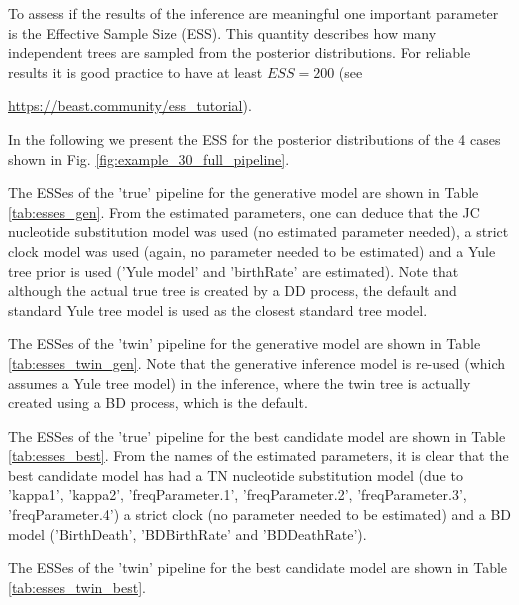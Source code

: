 To assess if the results of the inference are meaningful one important 
parameter is the Effective Sample Size (ESS). This quantity describes how 
many independent trees are sampled from the posterior distributions. 
For reliable results it is good practice to have at 
least $ESS = 200$ (see 
\begin{sloppypar}
  \url{https://beast.community/ess_tutorial}).
\end{sloppypar}
In the following we present the ESS for the posterior distributions of 
the 4 cases shown in Fig. \ref{fig:example_30_full_pipeline}.

The ESSes of the 'true' pipeline for the generative model
are shown in Table \ref{tab:esses_gen}.
From the estimated parameters, one can deduce that
the JC nucleotide substitution model was used (no
estimated parameter needed), a strict clock model was 
used (again, no parameter needed to be estimated)
and a Yule tree prior is used ('Yule model' and 'birthRate' are estimated).
Note that although the actual true tree is created by a DD process, 
the default and standard Yule tree model is used as the closest
standard tree model.



\newpage

The ESSes of the 'twin' pipeline for the generative model
are shown in Table \ref{tab:esses_twin_gen}.
Note that the generative inference model is 
re-used (which assumes a Yule tree model) in the inference, 
where the twin tree is actually created using a BD process,
which is the default.



\newpage

The ESSes of the 'true' pipeline for the best candidate model
are shown in Table \ref{tab:esses_best}. 
From the names of the estimated parameters, it is clear that
the best candidate model has had a TN nucleotide substitution 
model (due to 'kappa1', 'kappa2', 'freqParameter.1', 
'freqParameter.2', 'freqParameter.3', 'freqParameter.4')
a strict clock (no parameter needed to be estimated) and a BD 
model ('BirthDeath', 'BDBirthRate' and 'BDDeathRate').



\newpage

The ESSes of the 'twin' pipeline for the best candidate model
are shown in Table \ref{tab:esses_twin_best}.

